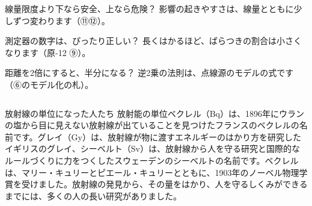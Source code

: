 \begin{tsumazuki}{線量限度より下なら安全、上なら危険？}
影響の起きやすさは、線量とともに少しずつ変わります（⑪⑫）。
\end{tsumazuki}

\begin{tsumazuki}{測定器の数字は、ぴったり正しい？}
長くはかるほど、ばらつきの割合は小さくなります（原-12 ⑨）。
\end{tsumazuki}

\begin{tsumazuki}{距離を2倍にすると、半分になる？}
逆2乗の法則は、点線源のモデルの式です（⑥のモデル化の札）。
\end{tsumazuki}

\begin{column}{放射線の単位になった人たち}
放射能の単位ベクレル（Bq）は、1896年にウランの塩から目に見えない放射線が出ていることを見つけたフランスのベクレルの名前です。グレイ（Gy）は、放射線が物に渡すエネルギーのはかり方を研究したイギリスのグレイ、シーベルト（Sv）は、放射線から人を守る研究と国際的なルールづくりに力をつくしたスウェーデンのシーベルトの名前です。ベクレルは、マリー・キュリーとピエール・キュリーとともに、1903年のノーベル物理学賞を受けました。放射線の発見から、その量をはかり、人を守るしくみができるまでには、多くの人の長い研究がありました。
\end{column}

